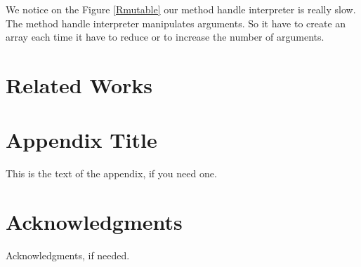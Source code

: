 \documentclass{sig-alternate}
\begin{document}
  We notice on the Figure \ref{Rmutable} our method handle interpreter is really slow.
  The method handle interpreter manipulates arguments.
  So it have to create an array each time it have to reduce or to increase the number of arguments.

\section{Related Works}

\appendix
\section{Appendix Title}

This is the text of the appendix, if you need one.

\section{Acknowledgments}

Acknowledgments, if needed.


\makeatletter
  \def\@seccntformat#1{Appendix~\csname the#1\endcsname:\quad}
\makeatother

% 

\end{document}
